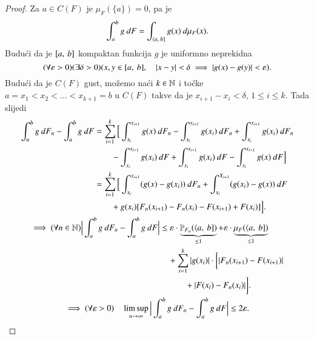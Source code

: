 \begin{proof}
    Za $a \in C(F)$ je $\mu_F (\{ a \}) = 0$, pa je
    \begin{equation*}
        \int_a^b g \: dF = \int_{\langle {a}, \: {b}]} g(x) \: d \mu_F (x).
    \end{equation*}
    Budu\' ci da je $[{a}, \:{b}]$ kompaktan funkcija $g$ je uniformno neprekidna
    \begin{equation*}
        (\forall \varepsilon > 0) (\exists \delta > 0) (x, y \in [{a}, \:{b}], \quad |x - y| < \delta \implies |g(x) - g(y)| < \varepsilon).
    \end{equation*}
    Budu\' ci da je $C(F)$ gust, mo\v zemo na\' ci $k \in \mathbb{N}$ i to\v cke $a = x_1 < x_2 < \ldots < x_{k + 1} = b$ u $C(F)$ takve da je $x_{i + 1} - x_i < \delta$, $1 \leq i \leq k$.
    Tada slijedi
    \begin{equation*}
        \begin{gathered}
            \begin{aligned}
                \int_a^b g \: d F_n - \int_a^b g \: d F &= \sum\limits_{i = 1}^{k} \Big[ \int_{x_i}^{x_{i+1}} g(x) \: d F_n - \int_{x_i}^{x_{i + 1}} g(x_i) \: d F_n + \int_{x_i}^{x_{i+1}} g(x_i) \: d F_n\\
                &\quad \quad- \int_{x_i}^{x_{i + 1}} g(x_i) \: d F + \int_{x_i}^{x_{i + 1}} g(x_i) \: d F - \int_{x_i}^{x_{i + 1}} g(x) \: d F \Big]\\
                &= \sum\limits_{i = 1}^{k} \Big[ \int_{x_i}^{x_{i + 1}} (g (x) - g(x_i)) \: d F_n + \int_{x_i}^{X_{i + 1}} (g(x_i) - g(x)) \: d F\\
                &\quad \quad+ g(x_i) [ F_n (x_{i + 1}) - F_n (x_i) - F (x_{i + 1}) + F(x_i) ] \Big].
            \end{aligned}\\
            \begin{aligned}
                \implies (\forall n \in \mathbb{N}) \Big| \int_a^b g \: d F_n - \int_a^b g \: d F \Big| &\leq \varepsilon \cdot \underbrace{\mathbb{P}_{F_n} (\langle {a}, \: {b}])}_{\leq 1} + \varepsilon \cdot \underbrace{\mu_{F} (\langle {a}, \: {b}])}_{\leq 1}\\
                &\quad + \sum\limits_{i = 1}^{k} | g(x_i) | \cdot \bigg[| F_n (x_{i + 1}) - F (x_{i + 1}) |\\
                &\quad \quad \quad+ | F(x_i) - F_n (x_i) | \bigg].
            \end{aligned}\\
            \implies (\forall \varepsilon > 0) \quad \limsup\limits_{n \to \infty} \Big| \int_a^b g \: d F_n - \int_a^b g \: d F \Big| \leq 2 \varepsilon.
        \end{gathered}
    \end{equation*}
\end{proof}